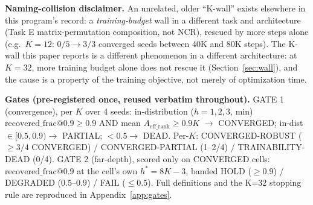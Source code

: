 \textbf{Naming-collision disclaimer.} An unrelated, older ``K-wall'' exists
elsewhere in this program's record: a \emph{training-budget} wall in a
different task and architecture (Task E matrix-permutation composition,
not NCR), rescued by more steps alone (e.g.\ $K{=}12$: $0/5 \to 3/3$
converged seeds between 40K and 80K steps).
The K-wall this paper reports is a different phenomenon in a different
architecture: at $K{=}32$, more training budget alone does not rescue it
(Section~\ref{sec:wall}), and the cause is a property of the training
objective, not merely of optimization time.

\textbf{Gates (pre-registered once, reused verbatim throughout).} GATE 1
(convergence), per $K$ over 4 seeds: in-distribution ($h{=}1,2,3$, min)
$\mathrm{recovered\_frac@0.9} \geq 0.9$ AND mean $A_{\mathrm{eff\_rank}}
\geq 0.9K$ $\to$ CONVERGED; in-dist $\in [0.5,0.9) \to$ PARTIAL; $< 0.5
\to$ DEAD. Per-$K$: CONVERGED-ROBUST ($\geq 3/4$ CONVERGED) /
CONVERGED-PARTIAL (1--2/4) / TRAINABILITY-DEAD (0/4). GATE 2 (far-depth),
scored only on CONVERGED cells: $\mathrm{recovered\_frac@0.9}$ at the
cell's own $h^\ast = 8K{-}3$, banded HOLD ($\geq 0.9$) / DEGRADED
($0.5$--$0.9$) / FAIL ($\leq 0.5$). Full definitions and the K=32 stopping
rule are reproduced in Appendix~\ref{app:gates}.
